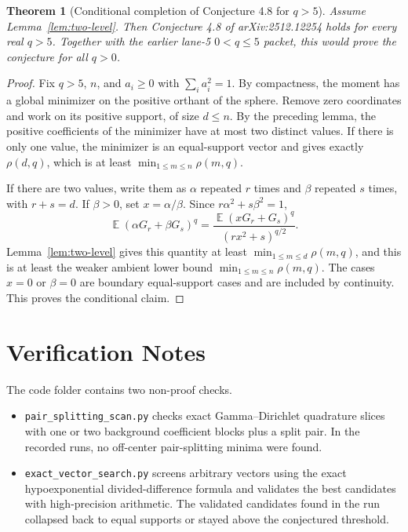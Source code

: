 \documentclass[11pt]{amsart}
\newtheorem{theorem}{Theorem}
\DeclareMathOperator{\E}{\mathbb E}
\begin{document}
\begin{theorem}[Conditional completion of Conjecture 4.8 for \(q>5\)]
Assume Lemma~\ref{lem:two-level}.  Then Conjecture 4.8 of arXiv:2512.12254
holds for every real \(q>5\).  Together with the earlier lane-5
\(0<q\le5\) packet, this would prove the conjecture for all \(q>0\).
\end{theorem}

\begin{proof}
Fix \(q>5\), \(n\), and \(a_i\ge0\) with \(\sum_i a_i^2=1\).  By compactness,
the moment has a global minimizer on the positive orthant of the sphere.
Remove zero coordinates and work on its positive support, of size \(d\le n\).
By the preceding lemma, the positive coefficients of the minimizer have at
most two distinct values.  If there is only one value, the minimizer is an
equal-support vector and gives exactly \(\rho(d,q)\), which is at least
\(\min_{1\le m\le n}\rho(m,q)\).

If there are two values, write them as \(\alpha\) repeated \(r\) times and
\(\beta\) repeated \(s\) times, with \(r+s=d\).  If \(\beta>0\), set
\(x=\alpha/\beta\).  Since \(r\alpha^2+s\beta^2=1\),
\[
  \E(\alpha G_r+\beta G_s)^q
  =
  \frac{\E(xG_r+G_s)^q}{(rx^2+s)^{q/2}} .
\]
Lemma~\ref{lem:two-level} gives this quantity at least
\(\min_{1\le m\le d}\rho(m,q)\), and this is at least the weaker ambient
lower bound \(\min_{1\le m\le n}\rho(m,q)\).  The cases \(x=0\) or
\(\beta=0\) are boundary equal-support cases and are included by continuity.
This proves the conditional claim.
\end{proof}

\section*{Verification Notes}

The code folder contains two non-proof checks.

\begin{itemize}
\item \texttt{pair\_splitting\_scan.py} checks exact Gamma--Dirichlet quadrature slices
with one or two background coefficient blocks plus a split pair.  In the
recorded runs, no off-center pair-splitting minima were found.
\item \texttt{exact\_vector\_search.py} screens arbitrary vectors using the exact
hypoexponential divided-difference formula and validates the best candidates
with high-precision arithmetic.  The validated candidates found in the run
collapsed back to equal supports or stayed above the conjectured threshold.
\end{itemize}
\end{document}
